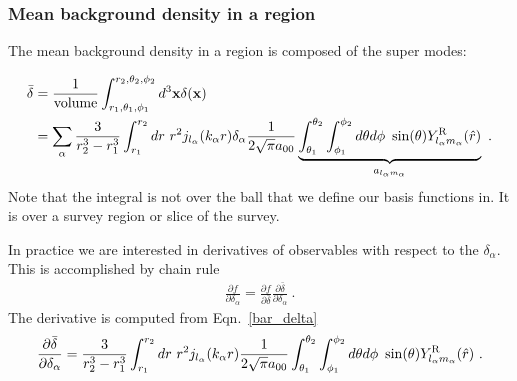 \subsubsection{Mean background density in a region}
The mean background density in a region is composed of the super modes:

\begin{align}
\label{bar_delta}
\begin{split} 
\bar{\delta} & = \frac{1}{\text{volume}} \int_{r_1, \theta_1, \phi_1}^{r_2, \theta_2, \phi_2} d^3 \mathbf{x} \delta(\mathbf{x}) \\
& = \displaystyle \sum_\alpha \frac{3}{r_2^3 - r_1^3} \int_{r_1}^ {r_2 }dr ~ r^2 j_{l_\alpha}(k_\alpha r) \delta_\alpha \frac{1}{2\sqrt{\pi} a_{00}} \underbrace{ \int_{\theta_1}^{\theta_2 }\int_{\phi_1}^{\phi_2} d  \theta d \phi ~\sin(\theta)Y^\text{R}_{l_\alpha m_\alpha}(\hat{r})}_{a_{l_\alpha m_\alpha}} ~.
\end{split}
\end{align}
Note that the integral is not over the ball that we define our basis functions in. It is over a survey region or slice of the survey. 


In practice we are interested in derivatives of observables with respect to the $\delta_\alpha$. This is accomplished by chain rule 
\begin{align}
\frac{\partial f}{\partial \delta_\alpha}= \frac{\partial f}{\partial \bar{\delta}} \frac{\partial \bar{\delta}}{\partial \delta_\alpha}~.
\end{align} 
The derivative is computed from Eqn.~\ref{bar_delta}
\begin{align}
\frac{\partial \bar{\delta} }{ \partial \delta_\alpha}=
\frac{3}{r_2^3 - r_1^3} \int_{r_1}^{r_2} dr ~ r^2 j_{l_\alpha}(k_\alpha r)  \frac{1}{2\sqrt{\pi} a_{00}}  \int_{\theta_1}^{\theta_2 } \int_{\phi_1}^{\phi_2} d\theta d \phi ~\sin(\theta)Y^\text{R}_{l_\alpha m_\alpha}(\hat{r})~.
\end{align}

